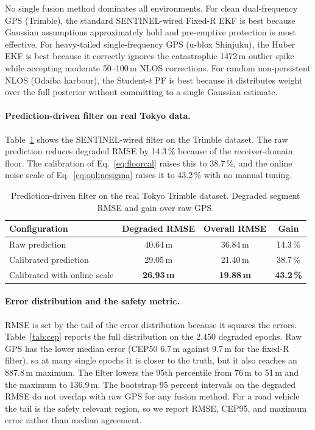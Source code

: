 \documentclass[12pt,a4paper]{article}
\begin{document}
No single fusion method dominates all environments.
For clean dual-frequency GPS (Trimble), the standard SENTINEL-wired Fixed-R EKF is best
because Gaussian assumptions approximately hold and pre-emptive protection is most effective.
For heavy-tailed single-frequency GPS (u-blox Shinjuku), the Huber EKF is best because
it correctly ignores the catastrophic 1472\,m outlier spike while accepting moderate
50--100\,m NLOS corrections.
For random non-persistent NLOS (Odaiba harbour), the Student-$t$ PF is best because
it distributes weight over the full posterior without committing to a single Gaussian estimate.

\paragraph{Prediction-driven filter on real Tokyo data.}
Table~\ref{tab:calibgen} shows the SENTINEL-wired filter on the Trimble dataset. The raw
prediction reduces degraded RMSE by 14.3\,\% because of the receiver-domain floor. The
calibration of Eq.~\eqref{eq:floorcal} raises this to 38.7\,\%, and the online noise scale
of Eq.~\eqref{eq:onlinesigma} raises it to 43.2\,\% with no manual tuning.

\begin{table}[H]
  \centering
  \caption{Prediction-driven filter on the real Tokyo Trimble dataset. Degraded segment
           RMSE and gain over raw GPS.}
  \label{tab:calibgen}
  \begin{tabular}{lccc}
    \toprule
    \textbf{Configuration} & \textbf{Degraded RMSE} & \textbf{Overall RMSE} & \textbf{Gain} \\
    \midrule
    Raw prediction               & 40.64\,m & 36.84\,m & 14.3\,\% \\
    Calibrated prediction        & 29.05\,m & 21.40\,m & 38.7\,\% \\
    Calibrated with online scale & \textbf{26.93\,m} & \textbf{19.88\,m} & \textbf{43.2\,\%} \\
    \bottomrule
  \end{tabular}
\end{table}

\paragraph{Error distribution and the safety metric.}
RMSE is set by the tail of the error distribution because it squares the errors.
Table~\ref{tab:cep} reports the full distribution on the 2{,}450 degraded epochs. Raw GPS
has the lower median error (CEP50 6.7\,m against 9.7\,m for the fixed-R filter), so at many
single epochs it is closer to the truth, but it also reaches an 887.8\,m maximum. The filter
lowers the 95th percentile from 76\,m to 51\,m and the maximum to 136.9\,m. The bootstrap
95 percent intervals on the degraded RMSE do not overlap with raw GPS for any fusion method.
For a road vehicle the tail is the safety relevant region, so we report RMSE, CEP95, and
maximum error rather than median agreement.
\end{document}
